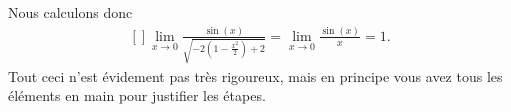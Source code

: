 Nous calculons donc
\begin{equation}
    \begin{aligned}[]
        \lim_{x\to 0} \frac{ \sin(x) }{ \sqrt{-2\left( 1-\frac{ x^2 }{ 2 } \right)+2} }=\lim_{x\to 0} \frac{ \sin(x) }{ x }=1.
    \end{aligned}
\end{equation}
Tout ceci n'est évidement pas très rigoureux, mais en principe vous avez tous les éléments en main pour justifier les étapes.
